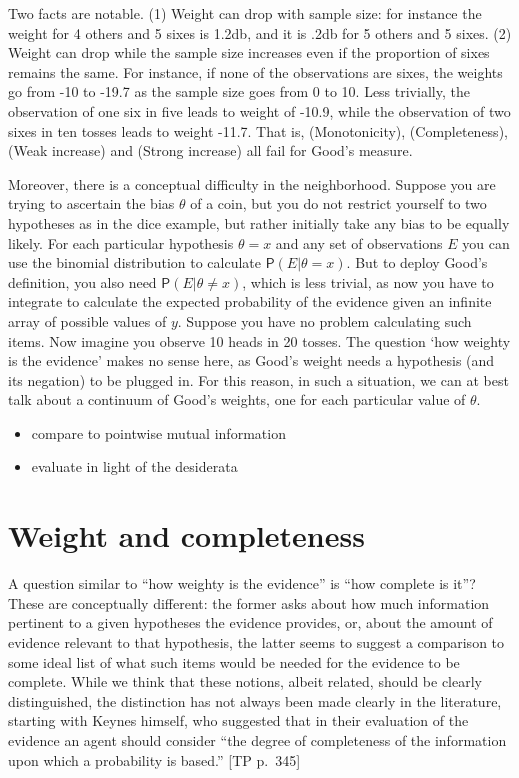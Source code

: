 \documentclass[
  10pt,
  dvipsnames,enabledeprecatedfontcommands]{scrartcl}
\newcommand{\pr}[1]{\mathsf{P}(#1)}
\begin{document}
Two facts are notable. (1) Weight can drop with sample size: for
instance the weight for 4 others and 5 sixes is 1.2db, and it is .2db
for 5 others and 5 sixes. (2) Weight can drop while the sample size
increases even if the proportion of sixes remains the same. For
instance, if none of the observations are sixes, the weights go from -10
to -19.7 as the sample size goes from 0 to 10. Less trivially, the
observation of one six in five leads to weight of -10.9, while the
observation of two sixes in ten tosses leads to weight -11.7. That is,
(Monotonicity), (Completeness), (Weak increase) and (Strong increase)
all fail for Good's measure.

Moreover, there is a conceptual difficulty in the neighborhood. Suppose
you are trying to ascertain the bias \(\theta\) of a coin, but you do
not restrict yourself to two hypotheses as in the dice example, but
rather initially take any bias to be equally likely. For each particular
hypothesis \(\theta = x\) and any set of observations \(E\) you can use
the binomial distribution to calculate \(\pr{E \vert \theta = x}\). But
to deploy Good's definition, you also need
\(\pr{E \vert \theta \neq x}\), which is less trivial, as now you have
to integrate to calculate the expected probability of the evidence given
an infinite array of possible values of \(y\). Suppose you have no
problem calculating such items. Now imagine you observe 10 heads in 20
tosses. The question `how weighty is the evidence' makes no sense here,
as Good's weight needs a hypothesis (and its negation) to be plugged in.
For this reason, in such a situation, we can at best talk about a
continuum of Good's weights, one for each particular value of
\(\theta\).

\begin{itemize}
\item
  compare to pointwise mutual information
\item
  evaluate in light of the desiderata
\end{itemize}

\hypertarget{weight-and-completeness}{%
\section{Weight and completeness}\label{weight-and-completeness}}

A question similar to ``how weighty is the evidence'' is ``how complete
is it''? These are conceptually different: the former asks about how
much information pertinent to a given hypotheses the evidence provides,
or, about the amount of evidence relevant to that hypothesis, the latter
seems to suggest a comparison to some ideal list of what such items
would be needed for the evidence to be complete. While we think that
these notions, albeit related, should be clearly distinguished, the
distinction has not always been made clearly in the literature, starting
with Keynes himself, who suggested that in their evaluation of the
evidence an agent should consider ``the degree of completeness of the
information upon which a probability is based.'' {[}TP
p.~345{]}
\end{document}
